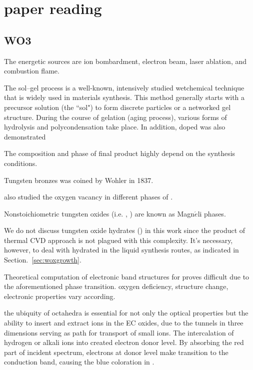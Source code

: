 \chapter{paper reading}



\section{WO3}

The energetic sources are ion bombardment, electron beam, laser ablation, and combustion flame\cite{Rao2011}.

The sol–gel process is a well-known, intensively studied wetchemical technique that is widely used in materials synthesis. This method generally starts with a precursor solution (the ``sol") to form discrete particles or a networked gel structure. During the course of gelation (aging process), various forms of hydrolysis and polycondensation take place.
In addition, doped  was also demonstrated

 The composition and phase of final product highly depend on the synthesis conditions.

 
Tungsten bronzes was coined by Wohler in 1837.\cite{Deb2008} 

\citeauthor{Chatten2005} also studied the oxygen vacancy in different phases of .\cite{Chatten2005}

Nonstoichiometric tungsten oxides  (i.e. , ) are known as Magn$\acute{e}$li phases.

We do not discuss tungsten oxide hydrates () in this work since the product of thermal CVD approach is not plagued with this complexity. It's necessary, however, to deal with hydrated  in the liquid synthesis routes, as indicated in Section.~\ref{sec:woxgrowth}.

Theoretical computation of electronic band structures for  proves difficult due to the aforementioned phase transition. oxygen deficiency, structure change, electronic properties vary according.

the ubiquity of  octahedra is essential for not only the optical properties but the ability to insert and extract ions in the EC oxides, due to the tunnels in three dimensions serving as path for transport of small ions. The intercalation of hydrogen or alkali ions into  created electron donor level. By absorbing the red part of incident spectrum, electrons at donor level make transition to the conduction band, causing the blue coloration in .

